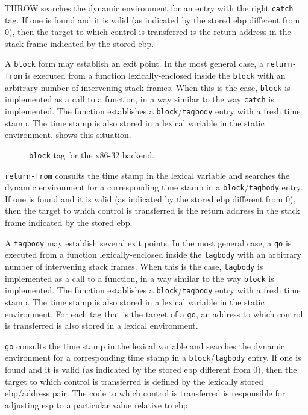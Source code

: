 THROW searches the dynamic environment for an entry with the right
\texttt{catch} tag.  If one is found and it is valid (as indicated by
the stored ebp different from 0), then the target to which control is
transferred is the return address in the stack frame indicated by the
stored ebp.

A \texttt{block} form may establish an exit point.  In the most
general case, a \texttt{return-from} is executed from a function
lexically-enclosed inside the \texttt{block} with an arbitrary number
of intervening stack frames.  When this is the case, \texttt{block} is
implemented as a call to a function, in a way similar to the way
\texttt{catch} is implemented.  The function establishes a
\texttt{block}/\texttt{tagbody} entry with a fresh time stamp.  The
time stamp is also stored in a lexical variable in the static
environment.   shows this situation.

\begin{figure}
\begin{center}
\end{center}
\caption{\label{fig-x86-32-block-tag}
\texttt{block} tag for the x86-32 backend.}
\end{figure}

\texttt{return-from} consults the time stamp in the lexical variable
and searches the dynamic environment for a corresponding time stamp in
a \texttt{block}/\texttt{tagbody} entry.  If one is found and it is
valid (as indicated by the stored ebp different from 0), then the
target to which control is transferred is the return address in the
stack frame indicated by the stored ebp.

A \texttt{tagbody} may establish several exit points.  In the most
general case, a \texttt{go} is executed from a function
lexically-enclosed inside the \texttt{tagbody} with an arbitrary
number of intervening stack frames.  When this is the case,
\texttt{tagbody} is implemented as a call to a function, in a way
similar to the way \texttt{block} is implemented.  The function
establishes a \texttt{block}/\texttt{tagbody} entry with a fresh time
stamp.  The time stamp is also stored in a lexical variable in the
static environment.  For each tag that is the target of a \texttt{go},
an address to which control is transferred is also stored in a lexical
environment.

\texttt{go} consults the time stamp in the lexical variable and
searches the dynamic environment for a corresponding time stamp in a
\texttt{block}/\texttt{tagbody} entry.  If one is found and it is
valid (as indicated by the stored ebp different from 0), then the
target to which control is transferred is defined by the lexically
stored ebp/address pair.  The code to which control is transferred is
responsible for adjusting esp to a particular value relative to ebp.

